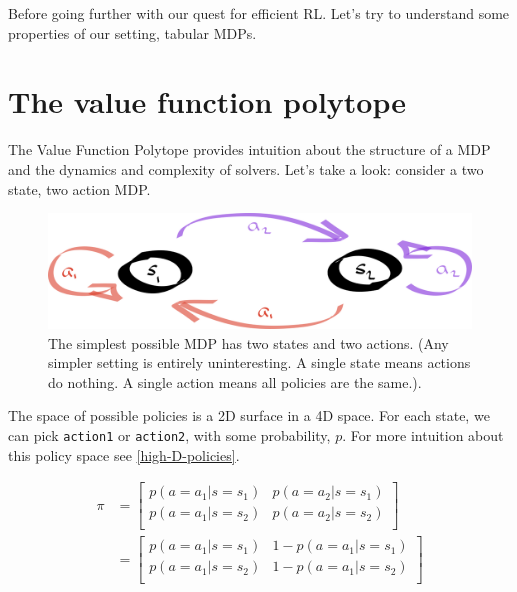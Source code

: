 
\newpage

Before going further with our quest for efficient RL. Let's try to understand
some properties of our setting, tabular MDPs.


\section{The value function polytope}

The Value Function Polytope \cite{Dadashi2018} provides intuition
about the structure of a MDP and the dynamics and complexity of solvers.
Let's take a look: consider a two state, two action MDP.

\begin{figure}[hb!]
\centering
\includegraphics[width=1\textwidth,height=0.25\textheight]{../../pictures/drawings/2-state-automata.png}
\caption{The simplest possible MDP has two states and two actions. (Any simpler setting is entirely uninteresting. A single state means actions do nothing.
A single action means all policies are the same.).}
\end{figure}

The space of possible policies is a 2D surface in a 4D space. For each state, we
can pick \texttt{action1} or \texttt{action2}, with some probability, $p$. For more intuition
about this policy space see \ref{high-D-policies}.

\begin{align}
\pi &=
\begin{bmatrix}
  p(a=a_1|s=s_1) & p(a=a_2|s=s_1) \\
  p(a=a_1|s=s_2) & p(a=a_2|s=s_2)\\
\end{bmatrix} \\
&=
\begin{bmatrix}
p(a=a_1|s=s_1) & 1-p(a=a_1|s=s_1) \\
p(a=a_1|s=s_2) & 1-p(a=a_1|s=s_2)\\
\end{bmatrix}
\end{align}

